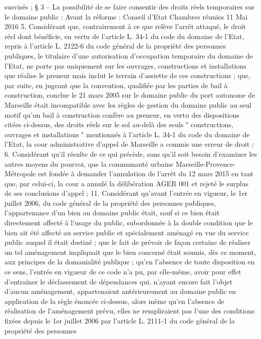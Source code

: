 \documentclass[11pt,a4paper]{report}
\begin{document}
susvisés ;
§ 3 – La possibilité de se faire consentir des droits réels temporaires sur le domaine public :
Avant la réforme : Conseil d'Etat Chambres réunies 11 Mai 2016 
5. Considérant que, contrairement à ce que relève l'arrêt attaqué, le droit réel dont bénéficie, en vertu de
l'article L. 34-1 du code du domaine de l'Etat, repris à l'article L. 2122-6 du code général de la propriété des
personnes publiques, le titulaire d'une autorisation d'occupation temporaire du domaine de l'Etat, ne porte pas
uniquement sur les ouvrages, constructions et installations que réalise le preneur mais inclut le terrain d'assiette
de ces constructions ; que, par suite, en jugeant que la convention, qualifiée par les parties de bail à
construction, conclue le 21 mars 2005 sur le domaine public du port autonome de Marseille était incompatible
avec les règles de gestion du domaine public au seul motif qu'un bail à construction confère au preneur, en vertu
des dispositions citées ci-dessus, des droits réels sur le sol au-delà des seuls " constructions, ouvrages et
installations " mentionnés à l'article L. 34-1 du code du domaine de l'Etat, la cour administrative d'appel de
Marseille a commis une erreur de droit ;
6. Considérant qu'il résulte de ce qui précède, sans qu'il soit besoin d'examiner les autres moyens du pourvoi,
que la communauté urbaine Marseille-Provence-Métropole est fondée à demander l'annulation de l'arrêt du 12
mars 2015 en tant que, par celui-ci, la cour a annulé la délibération \no  AGER 001 et rejeté le surplus de ses
conclusions d'appel ;
11. Considérant qu'avant l'entrée en vigueur, le 1er juillet 2006, du code général de la propriété des personnes
publiques, l'appartenance d'un bien au domaine public était, sauf si ce bien était directement affecté à l'usage du
public, subordonnée à la double condition que le bien ait été affecté au service public et spécialement aménagé
en vue du service public auquel il était destiné ; que le fait de prévoir de façon certaine de réaliser un tel
aménagement impliquait que le bien concerné était soumis, dès ce moment, aux principes de la domanialité
publique ; qu'en l'absence de toute disposition en ce sens, l'entrée en vigueur de ce code n'a pu, par elle-même,
avoir pour effet d'entraîner le déclassement de dépendances qui, n'ayant encore fait l'objet d'aucun
aménagement, appartenaient antérieurement au domaine public en application de la règle énoncée ci-dessus,
alors même qu'en l'absence de réalisation de l'aménagement prévu, elles ne rempliraient pas l'une des
conditions fixées depuis le 1er juillet 2006 par l'article L. 2111-1 du code général de la propriété des personnes
\end{document}
